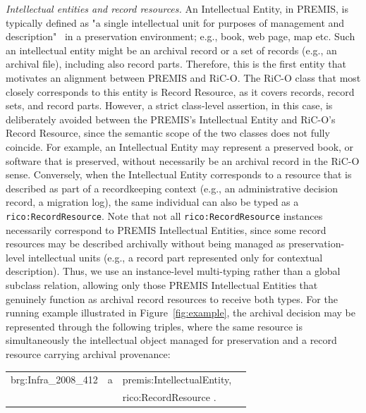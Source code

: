 \documentclass[runningheads]{llncs}
\makeatletter
\newenvironment{rdfexpressions}
{%
	\par
	\begingroup
	\centering
	\ttfamily
	\begin{tabular}{@{}r@{\ }l@{\ }l@{}l@{}}
	}
	{%
	\end{tabular}
	\par
	\endgroup
}
\makeatother
\begin{document}
\emph{Intellectual entities and record resources.} An Intellectual Entity, in PREMIS, is typically defined as "a single intellectual unit for purposes of management and description"~\cite{premis_data_dictionary_2015} in a preservation environment; e.g., book, web page, map etc. Such an intellectual entity might be an archival record or a set of records (e.g., an archival file), including also record parts. Therefore, this is the  first entity that motivates an alignment between PREMIS and RiC-O. The RiC-O class that most closely corresponds to this entity is Record Resource, as it covers records, record sets, and record parts. However, a strict class-level assertion, in this case, is deliberately avoided between the PREMIS's Intellectual Entity and RiC-O's  Record Resource, since the semantic scope of the two classes does not fully coincide. For example, an Intellectual Entity may represent a preserved book, or software that is preserved, without necessarily be an archival record in the RiC-O sense. Conversely, when the Intellectual Entity corresponds to a resource that is described as part of a recordkeeping context (e.g., an administrative decision record, a migration log), the same individual can also be typed as a \texttt{rico:RecordResource}. Note that not all \texttt{rico:RecordResource} instances necessarily correspond to PREMIS Intellectual Entities, since some record resources may be described archivally without being managed as preservation-level intellectual units (e.g., a record part represented only for contextual description). Thus, we use an instance-level multi-typing rather than a global subclass relation, allowing only those PREMIS Intellectual Entities that genuinely function as archival record resources to receive both types. For the running example illustrated in Figure~\ref{fig:example}, the archival decision may be represented through the following triples, where the same resource is simultaneously the intellectual object managed for preservation and a record resource carrying archival provenance:
\begin{rdfexpressions}
	brg:Infra\_2008\_412 & a & premis:IntellectualEntity, & \\
	& & rico:RecordResource .
\end{rdfexpressions}
\end{document}
